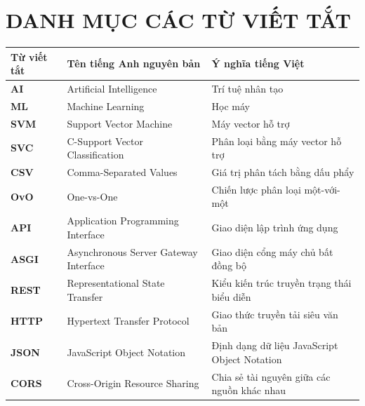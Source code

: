 \documentclass{article}
\begin{document}
	\section{\centering DANH MỤC CÁC TỪ VIẾT TẮT}
	\vspace{-0.5cm}
	\begin{table}[H]
		\centering
		\begin{tabular}{p{2cm} p{6.5cm} p{6.5cm}}
			\toprule
			\textbf{Từ viết tắt} & \textbf{Tên tiếng Anh nguyên bản} & \textbf{Ý nghĩa tiếng Việt} \\
			\midrule
			
			\textbf{AI} 
			& Artificial Intelligence 
			& Trí tuệ nhân tạo \\
			
			\textbf{ML} 
			& Machine Learning 
			& Học máy \\
			
			\textbf{SVM} 
			& Support Vector Machine 
			& Máy vector hỗ trợ \\
			
			\textbf{SVC} 
			& C-Support Vector Classification  
			& Phân loại bằng máy vector hỗ trợ \\
			
			\textbf{CSV} 
			& Comma-Separated Values
			& Giá trị phân tách bằng dấu phẩy \\
			
			\textbf{OvO} 
			& One-vs-One 
			& Chiến lược phân loại một-với-một \\
			
			\textbf{API} 
			& Application Programming Interface 
			& Giao diện lập trình ứng dụng \\
			
			\textbf{ASGI} 
			& Asynchronous Server Gateway Interface 
			& Giao diện cổng máy chủ bất đồng bộ \\
			
			\textbf{REST} 
			& Representational State Transfer 
			& Kiểu kiến trúc truyền trạng thái biểu diễn \\
			
			\textbf{HTTP} 
			& Hypertext Transfer Protocol 
			& Giao thức truyền tải siêu văn bản \\
			
			\textbf{JSON} 
			& JavaScript Object Notation 
			& Định dạng dữ liệu JavaScript Object Notation \\
			
			\textbf{CORS} 
			& Cross-Origin Resource Sharing 
			& Chia sẻ tài nguyên giữa các nguồn khác nhau \\
			

\end{tabular}
\end{table}
\end{document}
